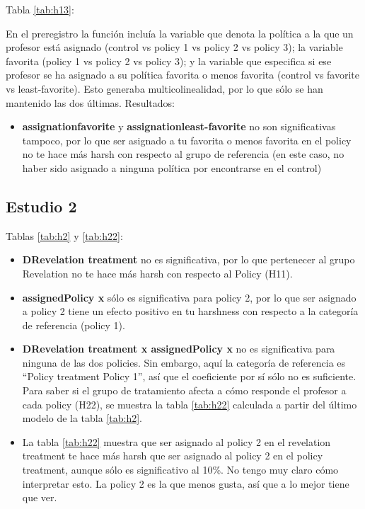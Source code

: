 \documentclass[12pt,a4]{article}
\newcommand{\tabpath}{../3. Output/tables/}
\begin{document}
	Tabla \ref{tab:h13}:
	
	En el preregistro la función incluía la variable que denota la política a la que un profesor está asignado (control vs policy 1 vs policy 2 vs policy 3); la variable favorita (policy 1 vs policy 2 vs policy 3); y la variable que especifica si ese profesor se ha asignado a su política favorita o menos favorita (control vs favorite vs least-favorite). Esto generaba multicolinealidad, por lo que sólo se han mantenido las dos últimas. Resultados:
	
	\begin{itemize}
		\item \textbf{assignationfavorite} y \textbf{assignationleast-favorite} no son significativas tampoco, por lo que ser asignado a tu favorita o menos favorita en el policy no te hace más harsh con respecto al grupo de referencia (en este caso, no haber sido asignado a ninguna política por encontrarse en el control)
	\end{itemize}
	
	
	\begin{table}
		\caption{Hipótesis H11 y H12}
		
	\label{tab:h1}
	\end{table}
	
	\begin{table}
		\caption{Hipótesis H13}
			
		\label{tab:h13}
	\end{table}

\clearpage

	\subsection{Estudio 2}
	
		Tablas \ref{tab:h2} y \ref{tab:h22}:
	\begin{itemize}
		\item 	\textbf{DRevelation treatment} no es significativa, por lo que pertenecer al grupo Revelation no te hace más harsh con respecto al Policy (H11).
		\item \textbf{assignedPolicy x} sólo es significativa para policy 2, por lo que ser asignado a policy 2 tiene un efecto positivo en tu harshness con respecto a la categoría de referencia (policy 1).
		\item \textbf{DRevelation treatment x assignedPolicy x} no es significativa para ninguna de las dos policies. Sin embargo, aquí la categoría de referencia es ``Policy treatment Policy 1'', así que el coeficiente por sí sólo no es suficiente. Para saber si el grupo de tratamiento afecta a cómo responde el profesor a cada policy (H22), se muestra la tabla \ref{tab:h22} calculada a partir del último modelo de la tabla \ref{tab:h2}.
		\item La tabla \ref{tab:h22} muestra que ser asignado al policy 2 en el revelation treatment te hace más harsh que ser asignado al policy 2 en el policy treatment, aunque sólo es significativo al 10\%. No tengo muy claro cómo interpretar esto. La policy 2 es la que menos gusta, así que a lo mejor tiene que ver.
	\end{itemize}
	
\end{document}
